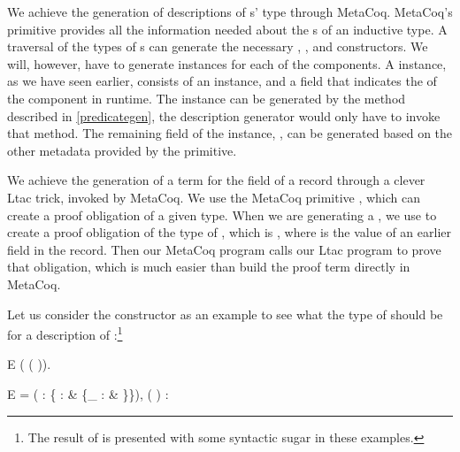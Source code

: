 We achieve the generation of \reified{} descriptions of \constructor{}s' type through MetaCoq. MetaCoq's \tmQuoteRec{} \gls{primitive} provides all the information needed about the \constructor{}s of an \gls{inductive type}. A traversal of the types of \constructor{}s can generate the necessary \TYPEPARAM{}, \ARG{}, and \RES{} constructors. We will, however, have to generate \ctorann{} instances for each of the components. A \ctorann{} instance, as we have seen earlier, consists of an \InGraph{} instance, and a field that indicates the \erasure{} of the component in runtime. The \InGraph{} instance can be generated by the method described in \autoref{predicategen}, the \constructor{} description generator would only have to invoke that method. The remaining field of the \ctorann{} instance, \iserased{}, can be generated based on the other metadata provided by the \tmQuoteRec{} \gls{primitive}.


We achieve the generation of a term for the \ctorreified{} field of a \ctordesc{} record through a clever \gls{Ltac} trick, invoked by MetaCoq. We use the MetaCoq \gls{primitive} \tmLemma{}, which can create a proof obligation of a given type. When we are generating a \ctordesc{}, we use \tmLemma{} to create a proof obligation of the type of \ctorreflected{}, which is , where \ctorreified{} is the value of an earlier field in the record. Then our MetaCoq program calls our \gls{Ltac} program to prove that obligation, which is much easier than build the proof term directly in MetaCoq.

Let us consider the  constructor as an example to see what the type of \ctorreified{} should be for a description of :\footnote{The result of  is presented with some syntactic sugar in these examples.}

\vspace{.2in}
\begin{SaveVerbatim}{E}
 ( (\ctorreified{} \nildesc{})).
\end{SaveVerbatim}

\begin{SaveVerbatim}{E}
=  ( : \{ :  \& \{_ : \ctorann{}  \& \}\}),
     ( )
: 
\end{SaveVerbatim}

